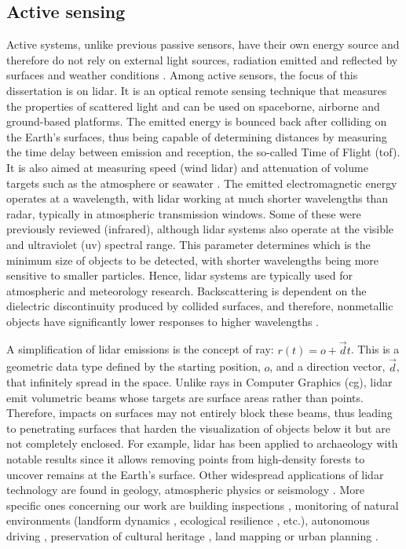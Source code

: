 \subsection{Active sensing}

Active systems, unlike previous passive sensors, have their own energy source and therefore do not rely on external light sources, radiation emitted and reflected by surfaces and weather conditions \cite{dong_lidar_2018}. Among active sensors, the focus of this dissertation is on \acrshort{lidar}. It is an optical remote sensing technique that measures the properties of scattered light and can be used on spaceborne, airborne and ground-based platforms. The emitted energy is bounced back after colliding on the Earth's surfaces, thus being capable of determining distances by measuring the time delay between emission and reception, the so-called Time of Flight (\acrshort{tof}). It is also aimed at measuring speed (wind \acrshort{lidar}) and attenuation of volume targets such as the atmosphere or seawater \cite{emery_introduction_2017}. The emitted electromagnetic energy operates at a wavelength, with \acrshort{lidar} working at much shorter wavelengths than radar, typically in atmospheric transmission windows. Some of these were previously reviewed (infrared), although \acrshort{lidar} systems also operate at the visible and ultraviolet (\acrshort{uv}) spectral range. This parameter determines which is the minimum size of objects to be detected, with shorter wavelengths being more sensitive to smaller particles. Hence, \acrshort{lidar} systems are typically used for atmospheric and meteorology research. Backscattering is dependent on the dielectric discontinuity produced by collided surfaces, and therefore, nonmetallic objects have significantly lower responses to higher wavelengths \cite{dong_lidar_2018}. 

A simplification of \acrshort{lidar} emissions is the concept of ray: $r(t) = o + \vec{d}t$. This is a geometric data type defined by the starting position, $o$, and a direction vector, $\vec{d}$, that infinitely spread in the space. Unlike rays in Computer Graphics (\acrshort{cg}), \acrshort{lidar} emit volumetric beams whose targets are surface areas rather than points. Therefore, impacts on surfaces may not entirely block these beams, thus leading to penetrating surfaces that harden the visualization of objects below it but are not completely enclosed. For example, \acrshort{lidar} has been applied to archaeology with notable results since it allows removing points from high-density forests to uncover remains at the Earth's surface. Other widespread applications of \acrshort{lidar} technology are found in geology, atmospheric physics or seismology \cite{emery_introduction_2017}. More specific ones concerning our work are building inspections \cite{shariq_revolutionising_2020}, monitoring of natural environments (landform dynamics \cite{guisado-pintado_3d_2019}, ecological resilience \cite{mitasova_geospatial_2010}, etc.), autonomous driving \cite{kuutti_survey_2021}, preservation of cultural heritage \cite{andriasyan_point_2020}, land mapping or urban planning \cite{zhou_street-view_2022}.


